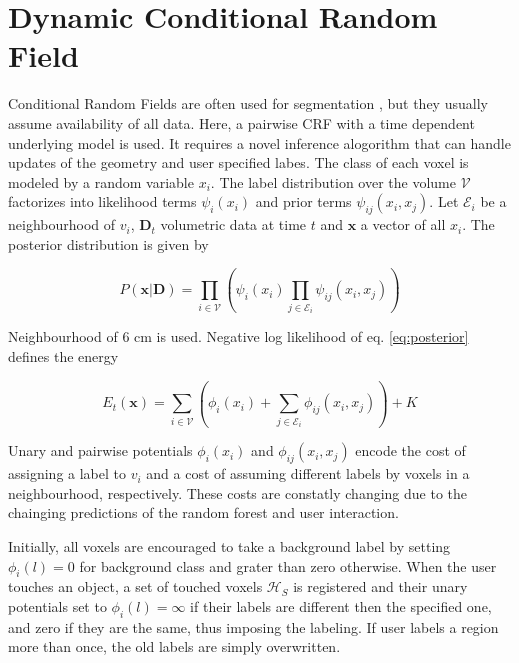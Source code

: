 \documentclass{llncs}
\begin{document}
\section{Dynamic Conditional Random Field}

 Conditional Random Fields are often used for segmentation \cite{VCRF}, but they usually assume availability of all data. Here, a pairwise CRF \cite{crf} with a time dependent underlying model is used. It requires a novel inference alogorithm that can handle updates of the geometry and user specified labes. The class of each voxel is modeled by a random variable $x_i$. The label distribution over the volume $\mathcal{V}$ factorizes into likelihood terms $\psi_i(x_i)$ and prior terms $\psi_{ij}(x_i, x_j)$. Let $\mathcal{E}_i$ be a neighbourhood of $v_i$, $\mathbf{D}_t $ volumetric data at time $t$ and $\mathbf{x}$ a vector of all $x_i$. The posterior distribution is given by
 
  \begin{equation} \label{eq:posterior}
  P(\mathbf{x}|\mathbf{D}) = \prod_{i \in \mathcal{V}} \left( \psi_i(x_i) \prod_{j \in \mathcal{E}_i} \psi_{ij}(x_i, x_j) \right) 
  \end{equation}

  Neighbourhood of 6 cm is used. Negative log likelihood of eq. \ref{eq:posterior} defines the energy

  \begin{equation} \label{eq:energy}
  E_t(\mathbf{x}) = \sum_{i \in \mathcal{V}} \left( \phi_i(x_i) + \sum_{j \in \mathcal{E}_i} \phi_{ij} (x_i, x_j) \right) + K
  \end{equation}

  Unary and pairwise potentials $\phi_i(x_i)$ and $\phi_{ij}(x_i, x_j)$ encode the cost of assigning a label to $v_i$ and a cost of assuming different labels by voxels in a neighbourhood, respectively. These costs are constatly changing due to the chainging predictions of the random forest and user interaction. 

  Initially, all voxels are encouraged to take a background label by setting $\phi_i(l) = 0$ for background class and grater than zero otherwise. When the user touches an object, a set of touched voxels $\mathcal{H}_S$ is registered and their unary potentials set to $\phi_i(l) = \infty$ if their labels are different then the specified one, and zero if they are the same, thus imposing the labeling. If user labels a region more than once, the old labels are simply overwritten. 
   
\end{document}
